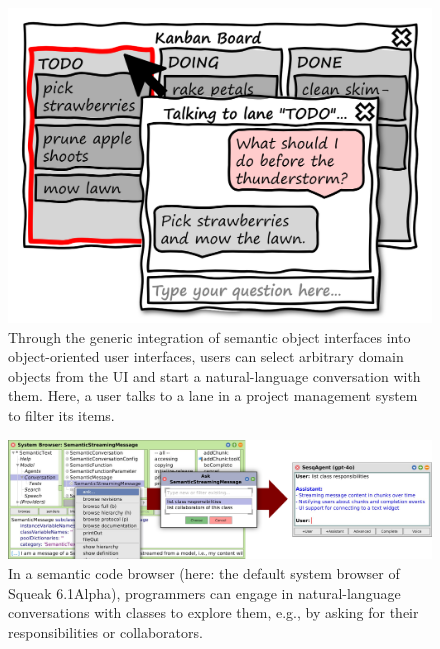 \begin{figure}
	\centering
	\includegraphics[height=12\baselineskip]{chapters/08_application/03_system/project.png}
	\caption[Sketching a generic integration of semantic object interfaces into object-oriented user interfaces.]{
		Through the generic integration of semantic object interfaces into object-oriented user interfaces, users can select arbitrary domain objects from the UI and start a natural-language conversation with them.
		Here, a user talks to a lane in a project management system to filter its items.
	}
	\label{fig:application/system/project}
\end{figure}

\begin{figure}[Z]
	\centering
	\includegraphics[width=\linewidth]{chapters/08_application/03_system/browser.png}
	\caption[In a semantic code browser, programmers can engage in natural-language conversations with classes to explore them, e.g., by asking for their responsibilities or collaborators.]{
		In a semantic code browser (here: the default system browser of Squeak 6.1Alpha), programmers can engage in natural-language conversations with classes to explore them, e.g., by asking for their responsibilities or collaborators.
	}
	\label{fig:application/system/browser}
\end{figure}

